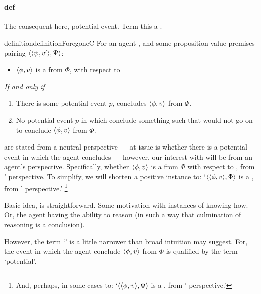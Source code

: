 \section{}
\label{cha:fcs:def}


\paragraph{\fc{} def}

\begin{note}
  The consequent here, potential event.
  Term this a \fc{}.

  \begin{restatable}{definition}{definitionForegoneC}
    \label{def:fc}
    For an agent \vAgent{}, and some proposition-value-premises pairing \(\langle \langle \psi, v' \rangle, \Psi \rangle\):

    \begin{itemize}
    \item
      \(\langle \phi, v \rangle\) is a \emph{} from \(\Phi\), with respect to \vAgent{}
    \end{itemize}
    \emph{If and only if}
    \begin{enumerate}[label=\alph*., ref=(\alph*)]
    \item
      \label{def:fc:is-pe-good}
      There is some potential event \(p\), \vAgent{} concludes \(\langle \phi, v \rangle\) from \(\Phi\).
    \item
      \label{def:fc:no-pe-bad}
      No potential event \(p\) in which \vAgent{} conclude something such that would not go on to conclude \(\langle \phi, v \rangle\) from \(\Phi\).
    \end{enumerate}
  \end{restatable}

   are stated from a neutral perspective --- at issue is whether there is a potential event in which the agent concludes --- however, our interest with  will be from an agent's perspective.
  Specifically, whether \(\langle \phi, v \rangle\) is a  from \(\Phi\) with respect to \vAgent{}, from \vAgent{}' perspective.
  To simplify, we will shorten a positive instance to:
  `\(\langle \langle \phi, v \rangle, \Phi \rangle\) is a , from \vAgent{}' perspective.'%
  \footnote{
    And, perhaps, in some cases to:
    `\(\langle \langle \phi, v \rangle, \Phi \rangle\) is a , from \vAgent{}' perspective.'
  }
\end{note}

\begin{note}
  Basic idea, is straightforward.
  Some motivation with instances of knowing how.
  Or, the agent having the ability to reason (in such a way that culmination of reasoning is a conclusion).

  However, the term `' is a little narrower than broad intuition may suggest.
  For, the event in which the agent conclude \(\langle \phi, v \rangle\) from \(\Phi\) is qualified by the term `potential'.
\end{note}

